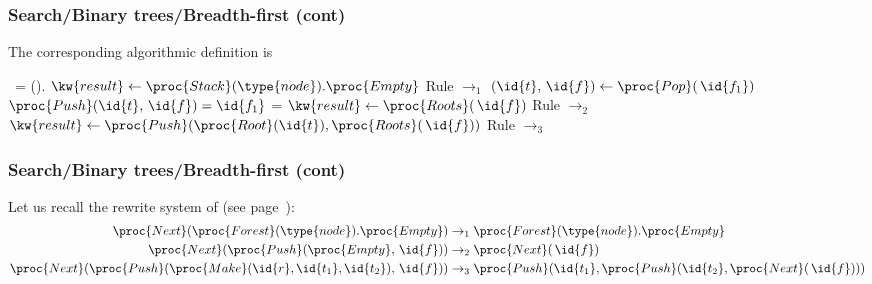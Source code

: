 %
\begin{frame}
\frametitle{Search/Binary trees/Breadth-first (cont)}

The corresponding algorithmic definition is
{\small
\begin{codebox}
\zi	\If \, = ().
\zi	\Then \(\kw{result} \gets
                \proc{Stack}(\type{node}).\proc{Empty}\) 
                \RComment Rule \(\rightarrow_1\)
\zi	\Else \((\id{t}, \,\id{f}) \gets \proc{Pop} (\,\id{f_1})\)
              \RComment \(\proc{Push} (\id{t}, \,\id{f}) =
              \id{f_1}\)
\zi		\If {} = 
\zi		\Then \(\kw{result} \gets \proc{Roots} (\,\id{f})\)
                        \RComment Rule \(\rightarrow_2\)
\zi		\Else \(\kw{result} \gets \proc{Push} (\proc{Root}
                        (\id{t}), \proc{Roots} (\,\id{f}))\)\!\!
                        \RComment\!\!\!Rule \(\rightarrow_3\)
\zi		\End
\zi	\End
\end{codebox}
}

\end{frame}

%
\begin{frame}
\frametitle{Search/Binary trees/Breadth-first (cont)}

Let us recall the rewrite system of  (see
page~\pageref{next_level}): 
\begin{align*}
   \proc{Next} (\proc{Forest}(\type{node}).\proc{Empty}) 
&\rightarrow_1 \proc{Forest}
   (\type{node}).\proc{Empty}\\
   \proc{Next} (\proc{Push} (\proc{Empty}, \,\id{f}))
&\rightarrow_2 \proc{Next} (\,\id{f})\\
   \proc{Next} (\proc{Push} (\proc{Make} (\id{r}, \id{t_1},
   \id{t_2}), \,\id{f}))
&\rightarrow_3 \proc{Push} (\id{t_1}, \proc{Push} (\id{t_2},
   \proc{Next} (\,\id{f})))
\end{align*}

\end{frame}

